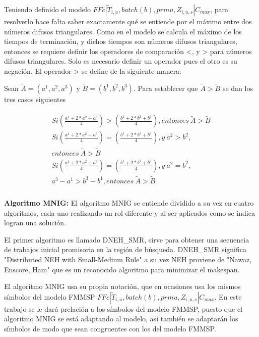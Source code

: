 \documentclass{article}
\def\notac_modelo{$FFc | \tilde{T}_{i, u}, batch(b), prmu, Z_{i, u, s} | C_{max}$}
\begin{document}
\vspace{\baselineskip}
Teniendo definido el modelo \notac_modelo, para resolverlo hace falta saber exactamente qué se entiende por el máximo entre dos números difusos triangulares. Como en el modelo se calcula el máximo de los tiempos de terminación, y dichos tiempos son números difusos triangulares, entonces se requiere definir los operadores de comparación <, y > para números difusos triangulares. Solo es necesario definir un operador pues el otro es su negación. El operador > se define de la siguiente manera: \autocite{modFMMSP}

\vspace{\baselineskip}
Sean $\tilde{A} = (a^1,a^2,a^3)$ y $\tilde{B} = (b^1,b^2,b^3)$. Para establecer que $\tilde{A} > \tilde{B}$ se dan los tres casos siguientes

\begin{align}
\begin{split}
    Si \left(\frac{a^1+2*a^2+a^3}{4}\right) > 
    \left(\frac{b^1+2*b^2+b^3}{4}\right), entonces\ \tilde{A} > \tilde{B}\\
    Si \left(\frac{a^1+2*a^2+a^3}{4}\right) = \left(\frac{b^1+2*b^2+b^3}{4}\right),
    y\ a^2 > b^2,\\ entonces\ \tilde{A} > \tilde{B}\\
    Si \left(\frac{a^1+2*a^2+a^3}{4}\right) = \left(\frac{b^1+2*b^2+b^3}{4}\right),
    y\ a^2 = b^2,\\ a^3-a^1 > b^3-b^1, entonces\ \tilde{A} > \tilde{B}\\
\end{split}
\end{align}

\vspace{\baselineskip}
\textbf{Algoritmo MNIG:} El algoritmo MNIG se entiende dividido a su vez en cuatro algoritmos, cada uno realizando un rol diferente y al ser aplicados como se indica logran una solución. \autocite{algMNIG}

\vspace{\baselineskip}
El primer algoritmo es llamado DNEH\_SMR, sirve para obtener una secuencia de trabajos inicial promisoria en la región de búsqueda. DNEH\_SMR significa "Distributed NEH with Small-Medium Rule" a su vez NEH proviene de "Nawaz, Enscore, Ham" que es un reconocido algoritmo para minimizar el makespan. \autocite{algMNIG}

\vspace{\baselineskip}
El algoritmo MNIG usa su propia notación, que en ocasiones usa los mismos símbolos del modelo FMMSP \notac_modelo. En este trabajo se le dará prelación a los símbolos del modelo FMMSP, puesto que el algoritmo MNIG se está adaptando al modelo, así también se adaptarán los símbolos de modo que sean congruentes con los del modelo FMMSP.
\end{document}

